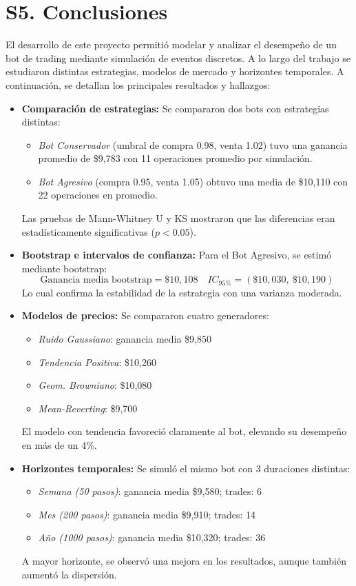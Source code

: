 \documentclass[a4paper,12pt]{article}
\begin{document}
\section*{S5. Conclusiones}

El desarrollo de este proyecto permitió modelar y analizar el desempeño de un bot de trading mediante simulación de eventos discretos. A lo largo del trabajo se estudiaron distintas estrategias, modelos de mercado y horizontes temporales. A continuación, se detallan los principales resultados y hallazgos:

\begin{itemize}
  \item \textbf{Comparación de estrategias:} Se compararon dos bots con estrategias distintas:
  \begin{itemize}
    \item \textit{Bot Conservador} (umbral de compra 0.98, venta 1.02) tuvo una ganancia promedio de \$9,783 con 11 operaciones promedio por simulación.
    \item \textit{Bot Agresivo} (compra 0.95, venta 1.05) obtuvo una media de \$10,110 con 22 operaciones en promedio.
  \end{itemize}
  Las pruebas de Mann-Whitney U y KS mostraron que las diferencias eran estadísticamente significativas (\( p < 0.05 \)).

  \item \textbf{Bootstrap e intervalos de confianza:} Para el Bot Agresivo, se estimó mediante bootstrap:
  \[
  \text{Ganancia media bootstrap} = \$10,108 \quad IC_{95\%} = (\$10,030,\ \$10,190)
  \]
  Lo cual confirma la estabilidad de la estrategia con una varianza moderada.

  \item \textbf{Modelos de precios:} Se compararon cuatro generadores:
  \begin{itemize}
    \item \textit{Ruido Gaussiano}: ganancia media \$9,850
    \item \textit{Tendencia Positiva}: \$10,260
    \item \textit{Geom. Browniano}: \$10,080
    \item \textit{Mean-Reverting}: \$9,700
  \end{itemize}
  El modelo con tendencia favoreció claramente al bot, elevando su desempeño en más de un 4\%.

  \item \textbf{Horizontes temporales:} Se simuló el mismo bot con 3 duraciones distintas:
  \begin{itemize}
    \item \textit{Semana (50 pasos)}: ganancia media \$9,580; trades: 6
    \item \textit{Mes (200 pasos)}: ganancia media \$9,910; trades: 14
    \item \textit{Año (1000 pasos)}: ganancia media \$10,320; trades: 36
  \end{itemize}
  A mayor horizonte, se observó una mejora en los resultados, aunque también aumentó la dispersión.


\end{itemize}
\end{document}
